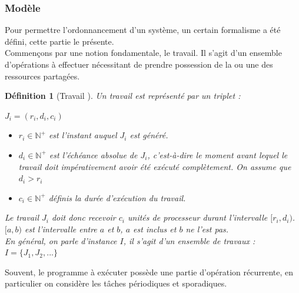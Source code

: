 \documentclass[a4paper]{report}
\theoremstyle{break}
\newtheorem{defin}{Définition}
\theoremstyle{breakplain}
\begin{document}
\subsubsection{Modèle}
Pour permettre l'ordonnancement d'un système, un certain formalisme a été défini, cette partie le présente.\\

Commençons par une notion fondamentale, le travail. Il s'agit d'un ensemble d'opérations à effectuer nécessitant de prendre possession de la ou une des ressources partagées.

\begin{defin}[Travail \cite{goossens2014os}]
Un travail est représenté par un triplet : 
\begin{center}
$J_i = (r_i, d_i, c_i)$
\end{center}
\begin{itemize}
\item $r_i \in \mathbb{N}^{+}$ est l'instant auquel $J_i$ est généré.
\item $d_i \in \mathbb{N}^{+}$ est l'échéance absolue de $J_i$, c'est-à-dire le moment avant lequel le travail doit impérativement avoir été exécuté complètement. On assume que $d_i > r_i$
\item $c_i \in \mathbb{N}^{+}$ définis la durée d'exécution du travail.
\end{itemize}
Le travail $J_i$ doit donc recevoir $c_i$ unités de processeur durant l'intervalle $[r_i, d_i)$. $[a,b)$ est l'intervalle entre $a$ et $b$, $a$ est inclus et $b$ ne l'est pas. \\
En général, on parle d'instance $I$, il s'agit d'un ensemble de travaux : $ I = \{J_1, J_2, ...\} $
\end{defin}

Souvent, le programme à exécuter possède une partie d'opération récurrente, en particulier on considère les tâches périodiques et sporadiques.
\end{document}
